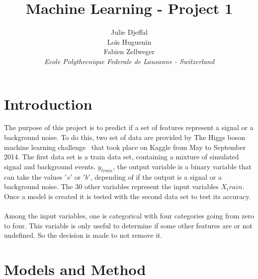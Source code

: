 \documentclass[10pt,conference,compsocconf]{IEEEtran}
\begin{document}
\title{Machine Learning - Project 1}

\author{
  Julie Djeffal \\
  Lo\"{i}s Huguenin \\
  Fabien Zellweger \\
  \textit{Ecole Polythecnique Federale de Lausanne - Switzerland}
}

\maketitle

\begin{abstract}
  
\end{abstract}

\section{Introduction}
The purpose of this project is to predict if a set of features represent a signal or a background noise. 
To do this, two set of data are provided by The Higgs boson machine learning challenge~\cite{challenge} that took place on Kaggle from May to September 2014. The first data set is a train data set, containing a mixture of simulated signal and background events.
$y_{train}$, the output variable is a binary variable that can take the values $'s'$ or $'b'$, depending of if the output is a signal or a background noise. The 30 other variables represent the input variables $X_train$. 
Once a model is created it is tested with the second data set to test its accuracy.\\
\\
Among the input variables, one is categorical with four categories going from zero to four. 
This variable is only useful to determine if some other features are or not undefined. So the decision is made to not remove it.



\section{Models and Method}
\end{document}
